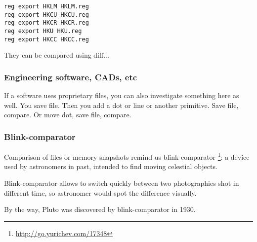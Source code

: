 \begin{lstlisting}
reg export HKLM HKLM.reg
reg export HKCU HKCU.reg
reg export HKCR HKCR.reg
reg export HKU HKU.reg
reg export HKCC HKCC.reg
\end{lstlisting}

They can be compared using diff...

\subsubsection{Engineering software, CADs, etc}

If a software uses proprietary files, you can also investigate something here as well.
You save file.
Then you add a dot or line or another primitive.
Save file, compare.
Or move dot, save file, compare.

\subsubsection{Blink-comparator}

Comparison of files or memory snapshots remind us blink-comparator
\footnote{\url{http://go.yurichev.com/17348}}:
a device used by astronomers in past, intended to find moving celestial objects.

Blink-comparator allows to switch quickly between two photographies shot in different time,
so astronomer would spot the difference visually.

By the way, Pluto was discovered by blink-comparator in 1930.
